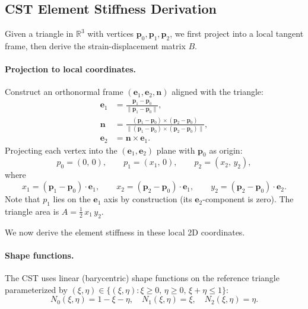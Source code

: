 \subsection{CST Element Stiffness Derivation}

Given a triangle in $\mathbb{R}^3$ with vertices $\mathbf{p}_0, \mathbf{p}_1, \mathbf{p}_2$, we first project into a local tangent frame, then derive the strain-displacement matrix $B$.

\paragraph{Projection to local coordinates.}
Construct an orthonormal frame $(\mathbf{e}_1, \mathbf{e}_2, \mathbf{n})$ aligned with the triangle:
\begin{align}
  \mathbf{e}_1 &= \frac{\mathbf{p}_1 - \mathbf{p}_0}{\|\mathbf{p}_1 - \mathbf{p}_0\|}, \\
  \mathbf{n} &= \frac{(\mathbf{p}_1 - \mathbf{p}_0) \times (\mathbf{p}_2 - \mathbf{p}_0)}{\|(\mathbf{p}_1 - \mathbf{p}_0) \times (\mathbf{p}_2 - \mathbf{p}_0)\|}, \\
  \mathbf{e}_2 &= \mathbf{n} \times \mathbf{e}_1.
\end{align}
Projecting each vertex into the $(\mathbf{e}_1, \mathbf{e}_2)$ plane with $\mathbf{p}_0$ as origin:
\begin{equation}
  p_0 = (0,\, 0), \qquad
  p_1 = (x_1,\, 0), \qquad
  p_2 = (x_2,\, y_2),
\end{equation}
where
\begin{equation}
  x_1 = (\mathbf{p}_1 - \mathbf{p}_0) \cdot \mathbf{e}_1, \qquad
  x_2 = (\mathbf{p}_2 - \mathbf{p}_0) \cdot \mathbf{e}_1, \qquad
  y_2 = (\mathbf{p}_2 - \mathbf{p}_0) \cdot \mathbf{e}_2.
\end{equation}
Note that $p_1$ lies on the $\mathbf{e}_1$ axis by construction (its $\mathbf{e}_2$-component is zero). The triangle area is $A = \tfrac{1}{2}\, x_1\, y_2$.

We now derive the element stiffness in these local 2D coordinates.

\paragraph{Shape functions.}
The CST uses linear (barycentric) shape functions on the reference triangle parameterized by $(\xi, \eta) \in \{(\xi,\eta) : \xi \geq 0,\, \eta \geq 0,\, \xi + \eta \leq 1\}$:
\begin{equation}
  N_0(\xi, \eta) = 1 - \xi - \eta, \quad
  N_1(\xi, \eta) = \xi, \quad
  N_2(\xi, \eta) = \eta.
\end{equation}

